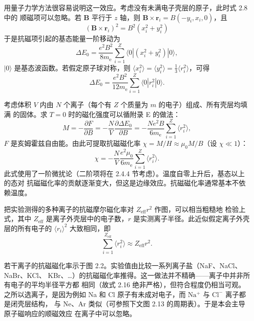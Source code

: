 用量子力学方法很容易说明这一效应。考虑没有未满电子壳层的原子，此时式 2.8 中的
顺磁项可以忽略。若 $\mathbf{B}$ 平行于 $z$ 轴，则 $\mathbf{B}\times\mathbf{r}_i = B(-y_i, x_i, 0)$，且
\begin{equation*}
(\mathbf{B}\times\mathbf{r}_i)^{2} = B^{2}(x_i^{2}+y_i^{2})\tag{2.11}
\end{equation*}
于是抗磁项引起的基态能量一阶移动为
\begin{equation*}
\Delta E_0 = \frac{e^{2}B^{2}}{8m_{\mathrm{e}}}\sum_{i=1}^{Z}\langle 0|(x_i^{2}+y_i^{2})|0\rangle,\tag{2.12}
\end{equation*}
$|0\rangle$ 是基态波函数。若假定原子球对称，则 $\langle x_i^{2}\rangle=\langle y_i^{2}\rangle=\frac{1}{3}\langle r_i^{2}\rangle$，可得
\begin{equation*}
\Delta E_0 = \frac{e^{2}B^{2}}{12m_{\mathrm{e}}}\sum_{i=1}^{Z}\langle 0|r_i^{2}|0\rangle.\tag{2.13}
\end{equation*}

考虑体积 $V$ 内由 $N$ 个离子（每个有 $Z$ 个质量为 $m$ 的电子）组成、所有壳层均填满
的固体。求 $T=0$ 时的磁化强度可以循附录 E 的做法：
\begin{equation*}
M = -\frac{\partial F}{\partial B} = -\frac{N}{V}\frac{\partial\Delta E_0}{\partial B} = -\frac{Ne^{2}B}{6m_{\mathrm{e}}}\sum_{i=1}^{Z}\langle r_i^{2}\rangle,\tag{2.14}
\end{equation*}
$F$ 是亥姆霍兹自由能。由此可提取抗磁磁化率 $\chi=M/H\approx\mu_0M/B$（设 $\chi\ll1$）：
\begin{equation*}
\chi = -\frac{N}{V}\frac{e^{2}\mu_0}{6m_{\mathrm{e}}}\sum_{i=1}^{Z}\langle r_i^{2}\rangle.\tag{2.15}
\end{equation*}
此式使用了一阶微扰论（二阶项将在 2.4.4 节考虑）。温度自零上升后，基态以上的态对
抗磁磁化率的贡献逐渐变大，但这是边缘效应。抗磁磁化率通常基本不依赖温度。

把实验测得的多种离子的抗磁摩尔磁化率对 $Z_{\mathrm{eff}}r^{2}$ 作图，可以相当粗糙地
检验上式，其中 $Z_{\mathrm{eff}}$ 是离子外壳层中的电子数，$r$ 是实测离子半径。此近似假定离子外壳层的所有电子的
$\langle r_i\rangle^{2}$ 大致相同，即
\begin{equation*}
\sum_{i=1}^{Z_{\mathrm{eff}}}\langle r_i^{2}\rangle \approx Z_{\mathrm{eff}}r^{2}.\tag{2.16}
\end{equation*}

若干离子的抗磁磁化率示于图 2.2。实验值由比较一系列离子盐（NaF、NaCl、NaBr、KCl、
KBr、…）的抗磁磁化率推得。这一做法并不精确——离子中并非所有电子的平均半径平方都
相同（故式 2.16 绝非严格），但符合程度仍相当可观。之所以选离子，是因为例如 Na 和
Cl 原子有未成对电子，而 $\mathrm{Na^{+}}$ 与 $\mathrm{Cl^{-}}$ 离子都是闭壳层结构，
与 Ne、Ar 类似（可参照下文图 2.13 的周期表）。于是本会主导原子磁响应的顺磁效应
在离子中可以忽略。

